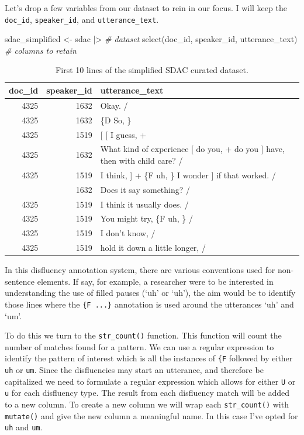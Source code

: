 \documentclass[
  letterpaper,
]{latex/krantz}
\newenvironment{Shaded}{\begin{snugshade}}{\end{snugshade}}
\newcommand{\CommentTok}[1]{\textcolor[rgb]{0.00,0.00,0.00}{\textit{#1}}}
\newcommand{\FunctionTok}[1]{\textcolor[rgb]{0.00,0.00,0.00}{#1}}
\newcommand{\NormalTok}[1]{\textcolor[rgb]{0.00,0.00,0.00}{#1}}
\newcommand{\OtherTok}[1]{\textcolor[rgb]{0.00,0.00,0.00}{#1}}
\newcommand{\SpecialCharTok}[1]{\textcolor[rgb]{0.00,0.00,0.00}{#1}}
\begin{document}
Let's drop a few variables from our dataset to rein in our focus. I will
keep the \texttt{doc\_id}, \texttt{speaker\_id}, and
\texttt{utterance\_text}.

\begin{Shaded}
\begin{Highlighting}[]
\NormalTok{sdac\_simplified }\OtherTok{\textless{}{-}} 
\NormalTok{  sdac }\SpecialCharTok{|\textgreater{}} \CommentTok{\# dataset}
  \FunctionTok{select}\NormalTok{(doc\_id, speaker\_id, utterance\_text) }\CommentTok{\# columns to retain}
\end{Highlighting}
\end{Shaded}

\hypertarget{tbl-td-sdac-simple-preview}{}
\begin{table}
\caption{\label{tbl-td-sdac-simple-preview}First 10 lines of the simplified SDAC curated dataset. }\tabularnewline

\centering
\begin{tabular}{rrl}
\toprule
doc\_id & speaker\_id & utterance\_text\\
\midrule
4325 & 1632 & Okay.  /\\
4325 & 1632 & \{D So, \}\\
4325 & 1519 & {}[ [ I guess, +\\
4325 & 1632 & What kind of experience [ do you, + do you ] have, then with child care? /\\
4325 & 1519 & I think, ] + \{F uh, \} I wonder ] if that worked. /\\
\addlinespace
4325 & 1632 & Does it say something? /\\
4325 & 1519 & I think it usually does.  /\\
4325 & 1519 & You might try, \{F uh, \}  /\\
4325 & 1519 & I don't know,  /\\
4325 & 1519 & hold it down a little longer,  /\\
\bottomrule
\end{tabular}
\end{table}

In this disfluency annotation system, there are various conventions used
for non-sentence elements. If say, for example, a researcher were to be
interested in understanding the use of filled pauses (`uh' or `uh'), the
aim would be to identify those lines where the \texttt{\{F\ ...\}}
annotation is used around the utterances `uh' and `um'.

To do this we turn to the \texttt{str\_count()} function. This function
will count the number of matches found for a pattern. We can use a
regular expression to identify the pattern of interest which is all the
instances of \texttt{\{F} followed by either \texttt{uh} or \texttt{um}.
Since the disfluencies may start an utterance, and therefore be
capitalized we need to formulate a regular expression which allows for
either \texttt{U} or \texttt{u} for each disfluency type. The result
from each disfluency match will be added to a new column. To create a
new column we will wrap each \texttt{str\_count()} with
\texttt{mutate()} and give the new column a meaningful name. In this
case I've opted for \texttt{uh} and \texttt{um}.
\end{document}
